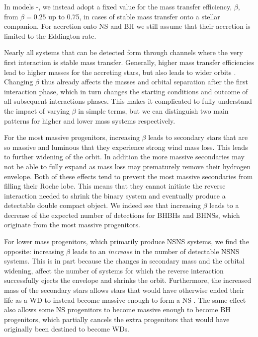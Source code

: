 In models \modBetaLow{}-\modBetaHigh{}, we instead adopt a fixed value for the mass transfer efficiency, $\beta$, from $\beta=0.25$ up to 0.75, in cases of stable mass transfer onto a stellar companion. For accretion onto NS and BH we still assume that their accretion is limited to the Eddington rate. 


Nearly all systems that can be detected form through channels where the very first interaction is stable mass transfer. Generally, higher mass transfer efficiencies lead to higher masses for the accreting stars, but also leads to wider orbits \citep{Soberman+1997, vanSon+2020}. Changing $\beta$ thus already affects the masses and orbital separation after the first interaction phase, which in turn changes the starting conditions and outcome of all subsequent interactions phases. This makes it complicated to fully understand the impact of varying $\beta$ in simple terms, but we can distinguish two main patterns for higher and lower mass systems respectively.   

For the most massive progenitors, increasing $\beta$ leads to secondary stars that are so massive and luminous that they experience strong wind mass loss. This leads to further widening of the orbit. In addition the more massive secondaries may not be able to fully expand as mass loss may prematurely remove their hydrogen envelope. Both of these effects tend to prevent the most massive secondaries from filling their Roche lobe. This means that they cannot initiate the reverse interaction needed to shrink the binary system and eventually produce a detectable double compact object. We indeed see that increasing $\beta$ leads to a decrease of the expected number of detections for BHBHs and BHNSs, which originate from the most massive progenitors.  

For lower mass progenitors, which primarily produce NSNS systems, we find the opposite: increasing $\beta$ leads to an \textit{increase} in the number of detectable NSNS systems. This is in part because  the changes in secondary mass and the orbital widening, affect the number of systems for which the reverse interaction successfully ejects the envelope and shrinks the orbit. Furthermore, the increased mass of the secondary stars allows stars that would have otherwise ended their life as a WD to instead become massive enough to form a NS \citep[e.g.\,][]{Zapartas+2017}. The same effect also allows some NS progenitors to become massive enough to become BH progenitors, which partially cancels the extra progenitors that would have originally been destined to become WDs.


